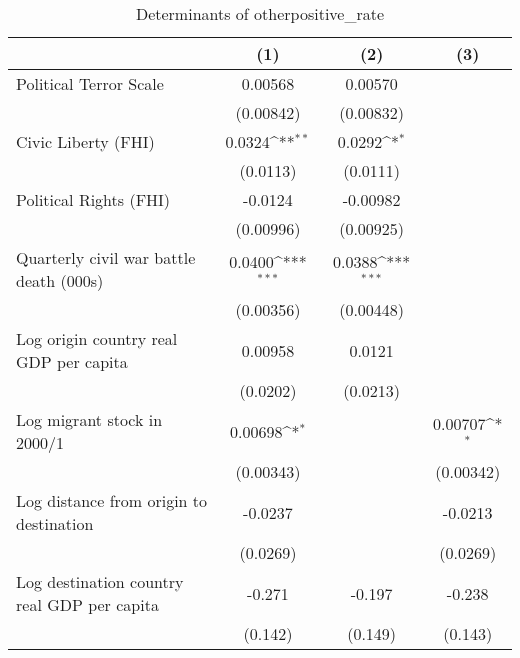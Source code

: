 \begin{table}[htbp]\centering
\def\sym#1{\ifmmode^{#1}\else\(^{#1}\)\fi}
\caption{Determinants of otherpositive\_rate}
\begin{tabular}{l*{3}{c}}
\hline\hline
                    &\multicolumn{1}{c}{(1)}         &\multicolumn{1}{c}{(2)}         &\multicolumn{1}{c}{(3)}         \\
\hline
Political Terror Scale&     0.00568         &     0.00570         &                     \\
                    &   (0.00842)         &   (0.00832)         &                     \\
[1em]
Civic Liberty (FHI) &      0.0324\sym{**} &      0.0292\sym{*}  &                     \\
                    &    (0.0113)         &    (0.0111)         &                     \\
[1em]
Political Rights (FHI)&     -0.0124         &    -0.00982         &                     \\
                    &   (0.00996)         &   (0.00925)         &                     \\
[1em]
Quarterly civil war battle death (000s)&      0.0400\sym{***}&      0.0388\sym{***}&                     \\
                    &   (0.00356)         &   (0.00448)         &                     \\
[1em]
Log origin country real GDP per capita&     0.00958         &      0.0121         &                     \\
                    &    (0.0202)         &    (0.0213)         &                     \\
[1em]
Log migrant stock in 2000/1&     0.00698\sym{*}  &                     &     0.00707\sym{*}  \\
                    &   (0.00343)         &                     &   (0.00342)         \\
[1em]
Log distance from origin to destination&     -0.0237         &                     &     -0.0213         \\
                    &    (0.0269)         &                     &    (0.0269)         \\
[1em]
Log destination country real GDP per capita&      -0.271         &      -0.197         &      -0.238         \\
                    &     (0.142)         &     (0.149)         &     (0.143)         \\

\end{tabular}
\end{table}

